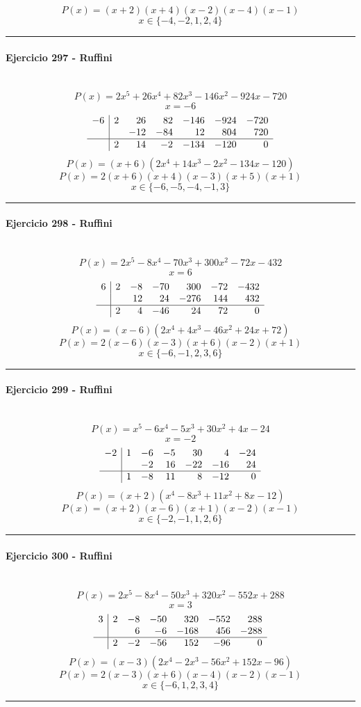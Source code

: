 \documentclass[10pt,a4paper]{article}
\newcommand{\res}[1]{\paragraph{#1}\mbox{}\\[-1.2em]}
\begin{document}
\[ P(x)=(x+2)(x+4)(x-2)(x-4)(x-1) \]
\[ \boxed{x\in\{-4,-2,1,2,4\}} \]
\vspace{1mm}\hrule\vspace{2mm}
\res{Ejercicio 297 - Ruffini}
\[ P(x)=2 x^{5} + 26 x^{4} + 82 x^{3} - 146 x^{2} - 924 x - 720 \]
\[ x=-6 \]
\[\begin{array}{r|rrrrrr}-6 & 2 & 26 & 82 & -146 & -924 & -720\\  &  & -12 & -84 & 12 & 804 & 720\\\hline  & 2 & 14 & -2 & -134 & -120 & 0\end{array}\]
\[ P(x)=(x+6)(2 x^{4} + 14 x^{3} - 2 x^{2} - 134 x - 120) \]
\[ P(x)=2(x+6)(x+4)(x-3)(x+5)(x+1) \]
\[ \boxed{x\in\{-6,-5,-4,-1,3\}} \]
\vspace{1mm}\hrule\vspace{2mm}
\res{Ejercicio 298 - Ruffini}
\[ P(x)=2 x^{5} - 8 x^{4} - 70 x^{3} + 300 x^{2} - 72 x - 432 \]
\[ x=6 \]
\[\begin{array}{r|rrrrrr}6 & 2 & -8 & -70 & 300 & -72 & -432\\  &  & 12 & 24 & -276 & 144 & 432\\\hline  & 2 & 4 & -46 & 24 & 72 & 0\end{array}\]
\[ P(x)=(x-6)(2 x^{4} + 4 x^{3} - 46 x^{2} + 24 x + 72) \]
\[ P(x)=2(x-6)(x-3)(x+6)(x-2)(x+1) \]
\[ \boxed{x\in\{-6,-1,2,3,6\}} \]
\vspace{1mm}\hrule\vspace{2mm}
\res{Ejercicio 299 - Ruffini}
\[ P(x)=x^{5} - 6 x^{4} - 5 x^{3} + 30 x^{2} + 4 x - 24 \]
\[ x=-2 \]
\[\begin{array}{r|rrrrrr}-2 & 1 & -6 & -5 & 30 & 4 & -24\\  &  & -2 & 16 & -22 & -16 & 24\\\hline  & 1 & -8 & 11 & 8 & -12 & 0\end{array}\]
\[ P(x)=(x+2)(x^{4} - 8 x^{3} + 11 x^{2} + 8 x - 12) \]
\[ P(x)=(x+2)(x-6)(x+1)(x-2)(x-1) \]
\[ \boxed{x\in\{-2,-1,1,2,6\}} \]
\vspace{1mm}\hrule\vspace{2mm}
\res{Ejercicio 300 - Ruffini}
\[ P(x)=2 x^{5} - 8 x^{4} - 50 x^{3} + 320 x^{2} - 552 x + 288 \]
\[ x=3 \]
\[\begin{array}{r|rrrrrr}3 & 2 & -8 & -50 & 320 & -552 & 288\\  &  & 6 & -6 & -168 & 456 & -288\\\hline  & 2 & -2 & -56 & 152 & -96 & 0\end{array}\]
\[ P(x)=(x-3)(2 x^{4} - 2 x^{3} - 56 x^{2} + 152 x - 96) \]
\[ P(x)=2(x-3)(x+6)(x-4)(x-2)(x-1) \]
\[ \boxed{x\in\{-6,1,2,3,4\}} \]
\vspace{1mm}\hrule\vspace{2mm}
\end{document}
